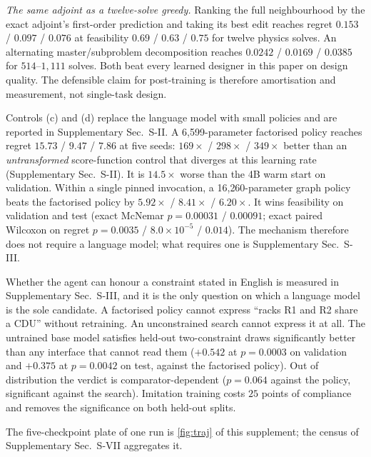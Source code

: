 \emph{The same adjoint as a twelve-solve greedy.}  Ranking the full
neighbourhood by the exact adjoint's first-order prediction and taking its best edit
reaches regret $0.153$ / $0.097$ / $0.076$ at feasibility $0.69$ / $0.63$ / $0.75$ for twelve physics solves. An alternating master/subproblem decomposition reaches
$0.0242$ / $0.0169$ / $0.0385$ for $514$--$1{,}111$ solves.  Both beat every learned
designer in this paper on design quality.  The defensible claim for post-training is
therefore amortisation and measurement, not single-task design.

Controls (c) and (d) replace the language model with small policies and are
reported in Supplementary Sec.~S-II.  A 6{,}599-parameter factorised policy reaches
regret $15.73$ / $9.47$ / $7.86$ at five seeds: $169\times$ / $298\times$ /
$349\times$ better than an \emph{untransformed} score-function control that
diverges at this learning rate (Supplementary Sec.~S-II). It is $14.5\times$ worse
than the 4B warm start on validation.  Within a single pinned invocation, a
16{,}260-parameter graph policy beats the factorised policy by $5.92\times$ /
$8.41\times$ / $6.20\times$.  It wins feasibility on validation and test (exact McNemar $p=0.00031$ / $0.00091$; exact paired Wilcoxon on regret $p=0.0035$ /
$8.0\times10^{-5}$ / $0.014$).  The mechanism therefore does not require a language
model; what requires one is Supplementary Sec.~S-III.

Whether the agent can honour a constraint stated in English is measured in
Supplementary Sec.~S-III, and it is the only question on which a language model is
the sole candidate. A factorised policy cannot express ``racks R1 and R2 share a
CDU'' without retraining. An unconstrained search cannot express it at all.
The untrained base model satisfies held-out two-constraint draws significantly
better than any interface that cannot read them ($+0.542$ at $p=0.0003$ on
validation and $+0.375$ at $p=0.0042$ on test, against the factorised policy). Out of distribution the verdict is comparator-dependent ($p=0.064$ against
the policy, significant against the search).  Imitation training costs $25$ points
of compliance and removes the significance on both held-out splits.

The five-checkpoint plate of one run is \cref{fig:traj} of this supplement; the census of Supplementary Sec.~S-VII aggregates it.

